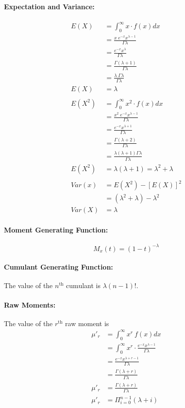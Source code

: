 \documentclass[
10pt, %
a4paper, %
]{report}
\begin{document}
\paragraph{Expectation and Variance:}
\begin{align*}
    E(X) &= \int_0^\infty x \cdot f(x) dx \\
         &= \frac{x\;e^{-x} x^{\lambda -1}}{\Gamma \lambda} \\
         &= \frac{e^{-x} x^{\lambda}}{\Gamma \lambda} \\
         &= \frac{\Gamma (\lambda+1)}{\Gamma \lambda} \\
         &= \frac{\lambda\;\Gamma \lambda}{\Gamma \lambda} \\
    E(X) &= \lambda \\ \\
    E(X^2) &= \int_0^\infty x^2 \cdot f(x) dx \\
           &= \frac{x^2\;e^{-x} x^{\lambda -1}}{\Gamma \lambda} \\
           &= \frac{e^{-x} x^{\lambda+1}}{\Gamma \lambda} \\
           &= \frac{\Gamma (\lambda+2)}{\Gamma \lambda} \\
           &= \frac{\lambda(\lambda+1)\Gamma \lambda}{\Gamma \lambda} \\
    E(X^2) &= \lambda(\lambda+1) = \lambda^2+\lambda  \\ \\
    Var(x) &= E(X^2) - [E(X)]^2 \\
           &= (\lambda^2+\lambda) - \lambda^2 \\
    Var(X) &= \lambda
\end{align*}

\paragraph{Moment Generating Function:}
\[
M_x(t)=(1-t)^{-\lambda}
\]

\paragraph{Cumulant Generating Function:}
The value of the \(n^{\text{th}}\) cumulant is \(\lambda(n-1)!\).

\paragraph{Raw Moments:}
The value of the \(r^{\text{th}}\) raw moment is
\begin{align*}
    \mu'_r &= \int_0^\infty x^r\:f(x)dx \\
           &= \int_0^\infty x^r \cdot \frac{e^{-x} x^{\lambda -1}}{\Gamma \lambda} \\
           &= \frac{e^{-x} x^{\lambda + r -1}}{\Gamma \lambda} \\
           &= \frac{\Gamma (\lambda+r)}{\Gamma \lambda} \\
    \mu'_r &= \frac{\Gamma (\lambda+r)}{\Gamma \lambda} \\
    \mu'_r &= \Pi_{i=0}^{n-1}(\lambda+i)
\end{align*}
\end{document}
